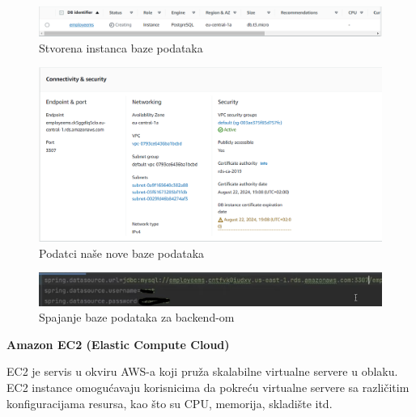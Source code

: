 			\begin{figure}[H]
				\includegraphics[scale=0.5]{slike/Deploy1.PNG} %
				\centering
				\caption{Stvorena instanca baze podataka}
				\label{fig:promjene}
			\end{figure}
			
				\begin{figure}[H]
				\includegraphics[scale=0.5]{slike/Deploy2.PNG} %
				\centering
				\caption{Podatci naše nove baze podataka}
				\label{fig:promjene}
			\end{figure}
			
			\begin{figure}[H]
				\includegraphics[scale=1]{slike/Deploy3.PNG} %
				\centering
				\caption{Spajanje baze podataka za backend-om}
				\label{fig:promjene}
			\end{figure}
			
				\textbf{Amazon EC2  (Elastic Compute Cloud) }
			\newline
			
			EC2 je servis u okviru AWS-a koji pruža skalabilne virtualne servere u oblaku. EC2 instance omogućavaju korisnicima da pokreću virtualne servere sa različitim konfiguracijama resursa, kao što su CPU, memorija, skladište itd.
			
			
			
			\eject 